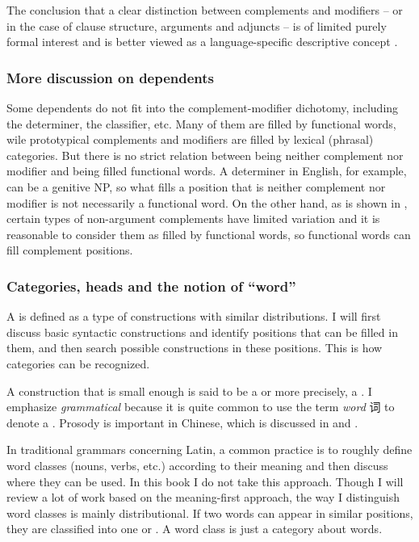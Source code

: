 \documentclass[../main.tex]{subfiles}
\begin{document}
The conclusion that a clear distinction between complements and modifiers -- 
or in the case of clause structure, arguments and adjuncts -- 
is of limited purely formal interest and 
is better viewed as a language-specific descriptive concept \citep{haspelmath2014arguments}. 

\subsubsection{More discussion on dependents}\label{sec:dependents-types-enumerate}

Some dependents do not fit into the complement-modifier dichotomy, 
including the determiner, the classifier, etc.
Many of them are filled by functional words,
wile prototypical complements and modifiers are filled by lexical (phrasal) categories.
But there is no strict relation 
between being neither complement nor modifier 
and being filled functional words.
A determiner in English, for example, 
can be a genitive NP, 
so what fills a position that is neither complement nor modifier 
is not necessarily a functional word.
On the other hand, 
as is shown in ,
certain types of non-argument complements have limited variation 
and it is reasonable to consider them as filled by functional words,
so functional words can fill complement positions. 

\subsubsection{Categories, heads and the notion of ``word''}

A  is defined as a type of constructions with similar distributions.
I will first discuss basic syntactic constructions and identify positions that can be filled in them, 
and then search possible constructions in these positions. This is how categories can be recognized.

A construction that is small enough is said to be a  or more precisely, 
a .
I emphasize \emph{grammatical} because it is quite common to use the term \emph{word} 词 to denote 
a . Prosody is important in Chinese, which is discussed in 
 and . 

In traditional grammars concerning Latin, 
a common practice is to roughly define word classes (nouns, verbs, etc.) 
according to their meaning and then discuss where they can be used. 
In this book I do not take this approach. 
Though I will review a lot of work based on the meaning-first approach, 
the way I distinguish word classes is mainly distributional. 
If two words can appear in similar positions, 
they are classified into one  or .
A word class is just a category about words.  
\end{document}
